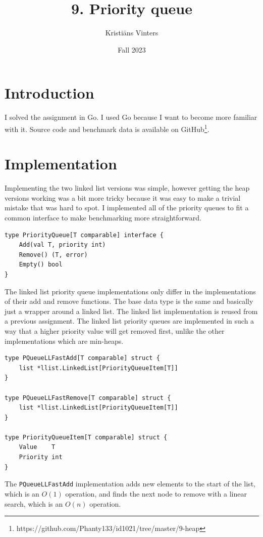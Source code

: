 \documentclass[a4paper,11pt]{article}
\title{\textbf{9. Priority queue}}
\author{Kristiāns Vinters}
\date{Fall 2023}
\begin{document}
    \maketitle
    \section*{Introduction}

    I solved the assignment in Go. I used Go because I want to become more familiar with it. Source code and benchmark data is available on GitHub\footnote{https://github.com/Phanty133/id1021/tree/master/9-heap}.

    \section*{Implementation}

    Implementing the two linked list versions was simple, however getting the heap versions working was a bit more tricky because it was easy to make a trivial mistake that was hard to spot. I implemented all of the priority queues to fit a common interface to make benchmarking more straightforward.

    \begin{verbatim}
type PriorityQueue[T comparable] interface {
    Add(val T, priority int)
    Remove() (T, error)
    Empty() bool
}
    \end{verbatim}

    The linked list priority queue implementations only differ in the implementations of their add and remove functions. The base data type is the same and basically just a wrapper around a linked list. The linked list implementation is reused from a previous assignment. The linked list priority queues are implemented in such a way that a higher priority value will get removed first, unlike the other implementations which are min-heaps.

    \begin{verbatim}
type PQueueLLFastAdd[T comparable] struct {
    list *llist.LinkedList[PriorityQueueItem[T]]
}

type PQueueLLFastRemove[T comparable] struct {
    list *llist.LinkedList[PriorityQueueItem[T]]
}

type PriorityQueueItem[T comparable] struct {
    Value    T
    Priority int
}
    \end{verbatim}

    The \texttt{PQueueLLFastAdd} implementation adds new elements to the start of the list, which is an $O(1)$ operation, and finds the next node to remove with a linear search, which is an $O(n)$ operation.
    
\end{document}

